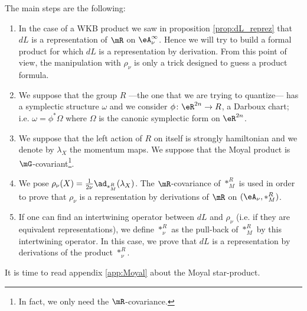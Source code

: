 The main steps are the following:
{\renewcommand{\theenumi}{\arabic{enumi}.}
\begin{enumerate}
\item In the case of a WKB product we saw in proposition \ref{prop:dL_reprez} that $dL$ is a representation of $\mR$ on $\eA_{\nu}^{\infty}$. Hence we will try to build a formal product for which $dL$ is a representation by derivation. From this point of view, the manipulation with $\rho_{\nu}$ is only a trick designed to guess a product formula.

\item We suppose that the group $R$ ---the one that we are trying to quantize--- has a symplectic structure $\omega$ and we consider $\phi\colon \eR^{2n}\to R$, a Darboux chart; i.e. $\omega=\phi^*\Omega$ where $\Omega$ is the canonic symplectic form on $\eR^{2n}$.

\item We suppose that the left action of $R$ on itself is strongly hamiltonian and we denote by $\lambda_X$ the momentum maps. We suppose that the Moyal product is $\mG$-covariant\footnote{In fact, we only need the $\mR$-covariance.}.

\item We pose $\rho_{\nu}(X)=\frac{1}{ 2\nu }\ad_{\ast_M^R}(\lambda_X)$. The $\mR$-covariance of $\ast_M^R$ is used in order to prove that $\rho_{\nu}$ is a  representation by derivations of $\mR$ on $(\eA_{\nu},\ast_M^R)$. 
\item If one can find an intertwining operator between $dL$ and $\rho_{\nu}$ (i.e. if they are equivalent representations), we define $\ast_{\nu}^R$ as the pull-back of $\ast_M^R$ by this intertwining operator. In this case, we prove that $dL$ is a representation by derivations of the product $\ast_{\nu}^R$.
\end{enumerate}

}		%
    It is time to read appendix \ref{app:Moyal} about the Moyal star-product.

